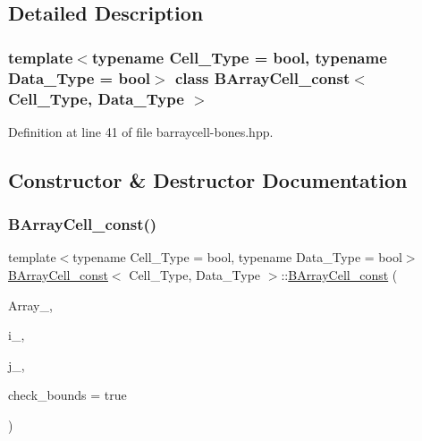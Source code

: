 \subsection{Detailed Description}
\subsubsection*{template$<$typename Cell\+\_\+\+Type = bool, typename Data\+\_\+\+Type = bool$>$\newline
class B\+Array\+Cell\+\_\+const$<$ Cell\+\_\+\+Type, Data\+\_\+\+Type $>$}



Definition at line 41 of file barraycell-\/bones.\+hpp.



\subsection{Constructor \& Destructor Documentation}
\mbox{\label{class_b_array_cell__const_a761f21bdc663adbdaf027c1fe7da6424}} 
\subsubsection{\texorpdfstring{B\+Array\+Cell\+\_\+const()}{BArrayCell\_const()}}
{\footnotesize\ttfamily template$<$typename Cell\+\_\+\+Type = bool, typename Data\+\_\+\+Type = bool$>$ \\
\hyperlink{class_b_array_cell__const}{B\+Array\+Cell\+\_\+const}$<$ Cell\+\_\+\+Type, Data\+\_\+\+Type $>$\+::\hyperlink{class_b_array_cell__const}{B\+Array\+Cell\+\_\+const} (\begin{DoxyParamCaption}\item[{const \hyperlink{class_b_array}{B\+Array}$<$ Cell\+\_\+\+Type, Data\+\_\+\+Type $>$ $\ast$}]{Array\+\_\+,  }\item[{\hyperlink{typedefs_8hpp_a91ad9478d81a7aaf2593e8d9c3d06a14}{uint}}]{i\+\_\+,  }\item[{\hyperlink{typedefs_8hpp_a91ad9478d81a7aaf2593e8d9c3d06a14}{uint}}]{j\+\_\+,  }\item[{bool}]{check\+\_\+bounds = {\ttfamily true} }\end{DoxyParamCaption})\hspace{0.3cm}{\ttfamily [inline]}}



